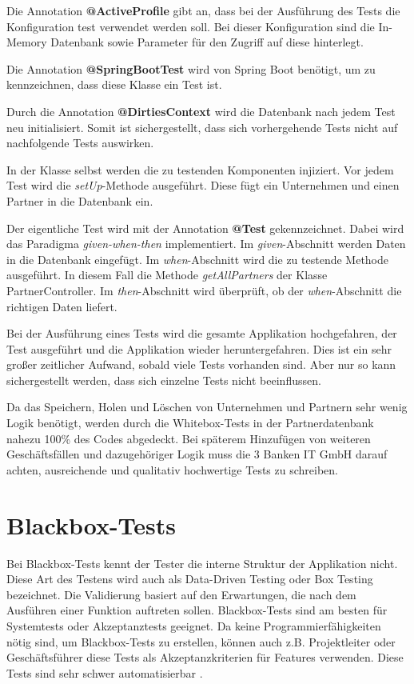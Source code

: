 Die Annotation \textbf{@ActiveProfile} gibt an, dass bei der Ausführung des Tests die Konfiguration \glqq test\grqq{} verwendet werden soll. Bei dieser Konfiguration sind die In-Memory Datenbank sowie Parameter für den Zugriff auf diese hinterlegt.

Die Annotation \textbf{@SpringBootTest} wird von Spring Boot benötigt, um zu kennzeichnen, dass diese Klasse ein Test ist. 

Durch die Annotation \textbf{@DirtiesContext} wird die Datenbank nach jedem Test neu initialisiert. Somit ist sichergestellt, dass sich vorhergehende Tests nicht auf nachfolgende Tests auswirken.

In der Klasse selbst werden die zu testenden Komponenten injiziert. Vor jedem Test wird die \textit{setUp}-Methode ausgeführt. Diese fügt ein Unternehmen und einen Partner in die Datenbank ein.

Der eigentliche Test wird mit der Annotation \textbf{@Test} gekennzeichnet. Dabei wird das Paradigma \textit{given-when-then} implementiert. Im \textit{given}-Abschnitt werden Daten in die Datenbank eingefügt. Im \textit{when}-Abschnitt wird die zu testende Methode ausgeführt. In diesem Fall die Methode \textit{getAllPartners} der Klasse PartnerController. Im \textit{then}-Abschnitt wird überprüft, ob der \textit{when}-Abschnitt die richtigen Daten liefert.

Bei der Ausführung eines Tests wird die gesamte Applikation hochgefahren, der Test ausgeführt und die Applikation wieder heruntergefahren. Dies ist ein sehr großer zeitlicher Aufwand, sobald viele Tests vorhanden sind. Aber nur so kann sichergestellt werden, dass sich einzelne Tests nicht beeinflussen.

Da das Speichern, Holen und Löschen von Unternehmen und Partnern sehr wenig Logik benötigt, werden durch die Whitebox-Tests in der Partnerdatenbank nahezu 100\% des Codes abgedeckt. Bei späterem Hinzufügen von weiteren Geschäftsfällen und dazugehöriger Logik muss die 3 Banken IT GmbH darauf achten, ausreichende und qualitativ hochwertige Tests zu schreiben. 

\section{Blackbox-Tests}
Bei Blackbox-Tests kennt der Tester die interne Struktur der Applikation nicht. Diese Art des Testens wird auch als Data-Driven Testing oder Box Testing bezeichnet. Die Validierung basiert auf den Erwartungen, die nach dem Ausführen einer Funktion auftreten sollen. Blackbox-Tests sind am besten für Systemtests oder Akzeptanztests geeignet. Da keine Programmierfähigkeiten nötig sind, um Blackbox-Tests zu erstellen, können auch z.B. Projektleiter oder Geschäftsführer diese Tests als Akzeptanzkriterien für Features verwenden. Diese Tests sind sehr schwer automatisierbar \cite{SoftwareQualityAssurance}. 

